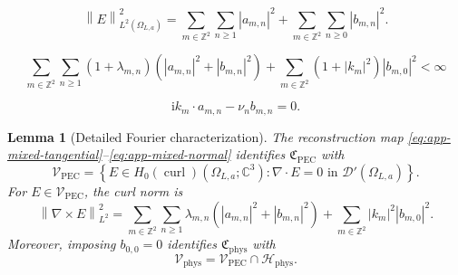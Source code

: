 \documentclass[10pt,a4paper]{amsart}
\newtheorem{lemma}{Lemma}
\providecommand{\C}{\mathbb{C}}
\providecommand{\Hphys}{\mathcal H_{\mathrm{phys}}}
\providecommand{\Hzcurl}{H_0(\operatorname{curl})}
\providecommand{\OmegaLa}{\Omega_{L,a}}
\providecommand{\VPEC}{\mathcal V_{\mathrm{PEC}}}
\providecommand{\Vphys}{\mathcal V_{\mathrm{phys}}}
\providecommand{\Z}{\mathbb{Z}}
\providecommand{\abs}[1]{\left\lvert #1\right\rvert}
\providecommand{\ii}{\mathrm{i}}
\providecommand{\norm}[1]{\left\lVert #1\right\rVert}
\providecommand{\paren}[1]{\left(#1\right)}
\providecommand{\set}[1]{\left\{#1\right\}}
\begin{document}
\begin{equation}
\label{eq:app-parseval-L2}
    \norm{E}_{L^2(\OmegaLa)}^2
    =
    \sum_{m\in\Z^2}\sum_{n\ge1}\abs{a_{m,n}}^2
    +
    \sum_{m\in\Z^2}\sum_{n\ge0}\abs{b_{m,n}}^2 .
\end{equation}

\begin{equation}
\label{eq:app-CPEC-summability}
    \sum_{m\in\Z^2}\sum_{n\ge1}
    (1+\lambda_{m,n})
    \paren{\abs{a_{m,n}}^2+\abs{b_{m,n}}^2}
    +
    \sum_{m\in\Z^2}(1+\abs{k_m}^2)\abs{b_{m,0}}^2
    <\infty
\end{equation}

\begin{equation}
\label{eq:app-div-constraint}
    \ii k_m\cdot a_{m,n}-\nu_n b_{m,n}=0 .
\end{equation}

\begin{lemma}[Detailed Fourier characterization]
\label{lem:app-fourier-characterization}
The reconstruction map \eqref{eq:app-mixed-tangential}--\eqref{eq:app-mixed-normal}
identifies \(\mathfrak C_{\mathrm{PEC}}\) with
\[
    \VPEC=
    \set{E\in\Hzcurl(\OmegaLa;\C^3):\nabla\cdot E=0
    \text{ in }\mathcal D'(\OmegaLa)} .
\]
For \(E\in\VPEC\), the curl norm is
\begin{equation}
\label{eq:app-curl-norm-diagonal}
    \norm{\nabla\times E}_{L^2}^2
    =
    \sum_{m\in\Z^2}\sum_{n\ge1}
    \lambda_{m,n}
    \paren{\abs{a_{m,n}}^2+\abs{b_{m,n}}^2}
    +
    \sum_{m\in\Z^2}\abs{k_m}^2\abs{b_{m,0}}^2 .
\end{equation}
Moreover, imposing \(b_{0,0}=0\) identifies \(\mathfrak C_{\mathrm{phys}}\) with
\[
    \Vphys=\VPEC\cap\Hphys .
\]
\end{lemma}
\end{document}

